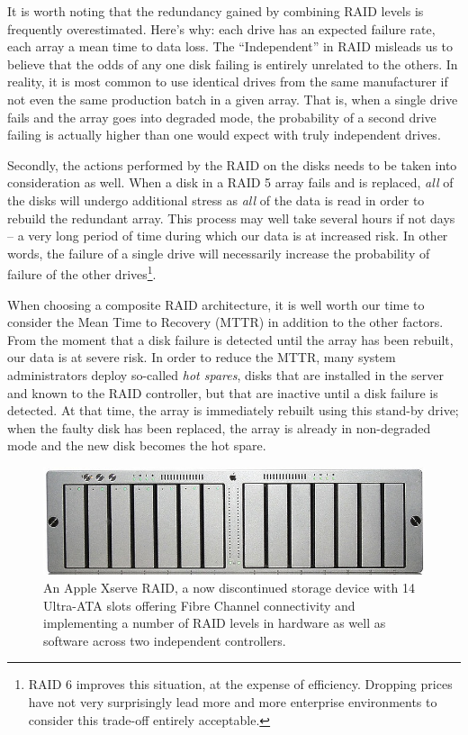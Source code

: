 It is worth noting that the redundancy gained by
combining RAID levels is frequently overestimated.
Here's why: each drive has an expected failure rate,
each array a mean time to data loss.  The
``Independent'' in RAID misleads us to believe that
the odds of any one disk failing is entirely unrelated
to the others.  In reality, it is most common to use
identical drives from the same manufacturer if not
even the same production batch in a given array.  That
is, when a single drive fails and the array goes into
degraded mode, the probability of a second drive
failing is actually higher than one would expect with
truly independent drives.

Secondly, the actions performed by the RAID on the
disks needs to be taken into consideration as well.
When a disk in a RAID 5 array fails and is replaced,
{\em all} of the disks will undergo additional stress
as {\em all} of the data is read in order to rebuild
the redundant array.  This process may well take
several hours if not days -- a very long period of
time during which our data is at increased risk.  In
other words, the failure of a single drive will
necessarily increase the probability of failure of the
other drives\footnote{RAID 6 improves this situation,
at the expense of efficiency.  Dropping prices have
not very surprisingly lead more and more enterprise
environments to consider this trade-off entirely
acceptable.}.

When choosing a composite RAID architecture, it is
well worth our time to consider the Mean Time to
Recovery (MTTR) in
addition to the other factors.  From the moment that
a disk failure is detected until the array has been
rebuilt, our data is at severe risk.  In order to
reduce the MTTR, many system administrators deploy
so-called {\em hot spares}, disks that are
installed in the server and known to the RAID
controller, but that are inactive until a disk failure
is detected.  At that time, the array is immediately
rebuilt using this stand-by drive; when the faulty
disk has been replaced, the array is already in
non-degraded mode and the new disk becomes the hot
spare.

\begin{figure}[ht]
	\centering
	\includegraphics[width=.75\textwidth]{04/pics/xraid}
		\caption[Apple Xserve RAID]{An Apple Xserve RAID, a
			now discontinued storage device with 14 Ultra-ATA
			slots offering Fibre Channel connectivity and
			implementing a number of RAID levels in hardware
			as well as software across two independent
			controllers.
			\label{fig:file-systems:xraid}}
\end{figure}

